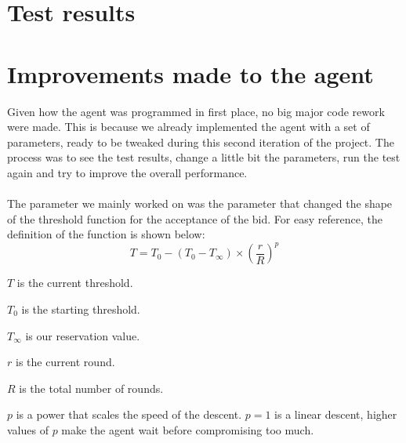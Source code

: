 \documentclass[a4,11pt]{scrartcl}
\let\tempone\itemize
\let\temptwo\enditemize
\renewenvironment{itemize}{\tempone\addtolength{\itemsep}{-0.5\baselineskip}}{\temptwo}
\begin{document}
\section{Test results}
\label{sec:testresults}



\section{Improvements made to the agent}
Given how the agent was programmed in first place, no big major code rework were made. This is because we already implemented the agent with a set of parameters, ready to be tweaked during this second iteration of the project. The process was to see the test results, change a little bit the parameters, run the test again and try to improve the overall performance.
\\ \\
The parameter we mainly worked on was the parameter that changed the shape of the threshold function for the acceptance of the bid. For easy reference, the definition of the function is shown below:
\\
\begin{equation}
    T=T_{0}-(T_{0}-T_{\infty})\times\left(\frac{r}{R}\right)^{p}
\end{equation}
\begin{itemize}
    \item $T$ is the current threshold.
    \item $T_{0}$ is the starting threshold.
    \item $T_{\infty}$ is our reservation value.
    \item $r$ is the current round.
    \item $R$ is the total number of rounds.
    \item $p$ is a power that scales the speed of the descent. $p=1$ is
    a linear descent, higher values of $p$ make the agent wait before
    compromising too much.
\end{itemize}
\end{document}
